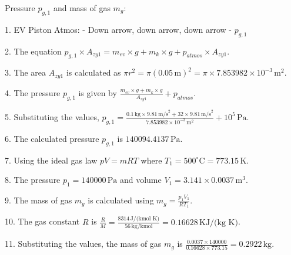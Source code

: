 Pressure \( p_{g,1} \) and mass of gas \( m_g \):

1. EV Piston Atmos:
   - Down arrow, down arrow, down arrow
   - \( p_{g,1} \)

2. The equation \( p_{g,1} \times A_{zy1} = m_{ev} \times g + m_{k} \times g + p_{atmos} \times A_{zy1} \).

3. The area \( A_{zy1} \) is calculated as \( \pi r^2 = \pi (0.05 \, \text{m})^2 = \pi \times 7.853982 \times 10^{-3} \, \text{m}^2 \).

4. The pressure \( p_{g,1} \) is given by \( \frac{m_{ev} \times g + m_k \times g}{A_{zy1}} + p_{atmos} \).

5. Substituting the values, \( p_{g,1} = \frac{0.1 \, \text{kg} \times 9.81 \, \text{m/s}^2 + 32 \times 9.81 \, \text{m/s}^2}{7.853982 \times 10^{-3} \, \text{m}^2} + 10^5 \, \text{Pa} \).

6. The calculated pressure \( p_{g,1} \) is \( 140094.4137 \, \text{Pa} \).

7. Using the ideal gas law \( pV = mRT \) where \( T_1 = 500^\circ \text{C} = 773.15 \, \text{K} \).

8. The pressure \( p_1 = 140000 \, \text{Pa} \) and volume \( V_1 = 3.141 \times 0.0037 \, \text{m}^3 \).

9. The mass of gas \( m_g \) is calculated using \( m_g = \frac{p_1 V_1}{RT_1} \).

10. The gas constant \( R \) is \( \frac{R}{M} = \frac{8314 \, \text{J/(kmol K)}}{56 \, \text{kg/kmol}} = 0.16628 \, \text{KJ/(kg K)} \).

11. Substituting the values, the mass of gas \( m_g \) is \( \frac{0.0037 \times 140000}{0.16628 \times 773.15} = 0.2922 \, \text{kg} \).
